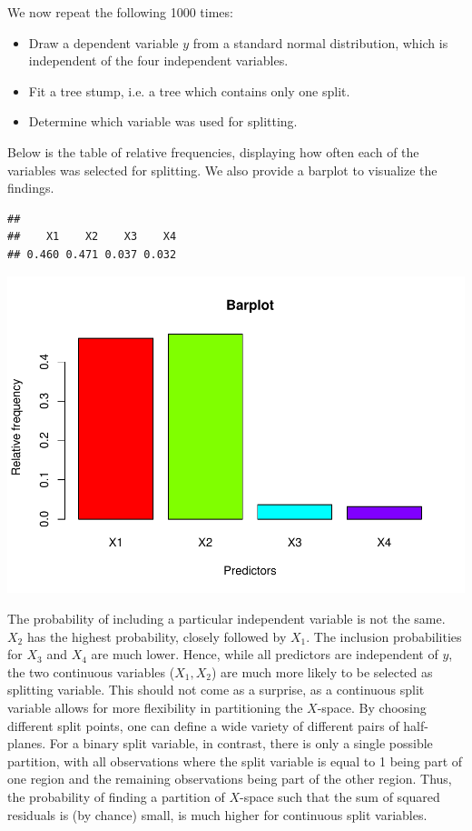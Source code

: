 \documentclass[
]{article}
\begin{document}
We now repeat the following 1000 times:

\begin{itemize}
  \item Draw a dependent variable $y$ from a standard normal distribution, which is independent of the four independent variables.
  \item Fit a tree stump, i.e. a tree which contains only one split.
  \item Determine which variable was used for splitting.
\end{itemize}

Below is the table of relative frequencies, displaying how often each of
the variables was selected for splitting. We also provide a barplot to
visualize the findings.

\begin{verbatim}
## 
##    X1    X2    X3    X4 
## 0.460 0.471 0.037 0.032
\end{verbatim}

\includegraphics{A3_files/figure-latex/unnamed-chunk-11-1.pdf}

The probability of including a particular independent variable is not
the same. \(X_2\) has the highest probability, closely followed by
\(X_1\). The inclusion probabilities for \(X_3\) and \(X_4\) are much
lower. Hence, while all predictors are independent of \(y\), the two
continuous variables (\(X_1, X_2\)) are much more likely to be selected
as splitting variable. This should not come as a surprise, as a
continuous split variable allows for more flexibility in partitioning
the \(X\)-space. By choosing different split points, one can define a
wide variety of different pairs of half-planes. For a binary split
variable, in contrast, there is only a single possible partition, with
all observations where the split variable is equal to 1 being part of
one region and the remaining observations being part of the other
region. Thus, the probability of finding a partition of \(X\)-space such
that the sum of squared residuals is (by chance) small, is much higher
for continuous split variables.
\end{document}
